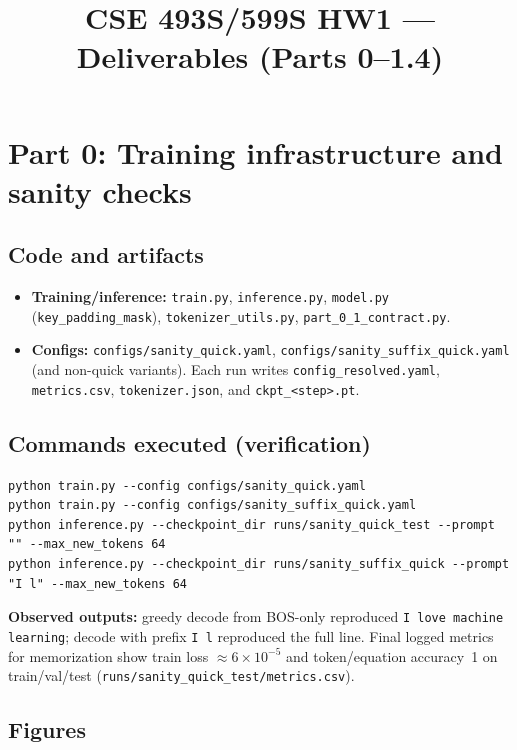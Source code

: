 \documentclass[11pt]{article}
\title{CSE 493S/599S HW1 --- Deliverables (Parts 0--1.4)}
\author{}
\date{}
\begin{document}
\maketitle

\section*{Part 0: Training infrastructure and sanity checks}

\subsection*{Code and artifacts}

\begin{itemize}
  \item \textbf{Training/inference:} \texttt{train.py}, \texttt{inference.py}, \texttt{model.py} (\texttt{key\_padding\_mask}), \texttt{tokenizer\_utils.py}, \texttt{part\_0\_1\_contract.py}.
  \item \textbf{Configs:} \texttt{configs/sanity\_quick.yaml}, \texttt{configs/sanity\_suffix\_quick.yaml} (and non-quick variants). Each run writes \texttt{config\_resolved.yaml}, \texttt{metrics.csv}, \texttt{tokenizer.json}, and \texttt{ckpt\_<step>.pt}.
\end{itemize}

\subsection*{Commands executed (verification)}

\begin{verbatim}
python train.py --config configs/sanity_quick.yaml
python train.py --config configs/sanity_suffix_quick.yaml
python inference.py --checkpoint_dir runs/sanity_quick_test --prompt "" --max_new_tokens 64
python inference.py --checkpoint_dir runs/sanity_suffix_quick --prompt "I l" --max_new_tokens 64
\end{verbatim}

\noindent
\textbf{Observed outputs:} greedy decode from BOS-only reproduced \texttt{I love machine learning}; decode with prefix \texttt{I l} reproduced the full line. Final logged metrics for memorization show train loss $\approx 6\times 10^{-5}$ and token/equation accuracy~1 on train/val/test (\texttt{runs/sanity\_quick\_test/metrics.csv}).

\subsection*{Figures}
\end{document}
